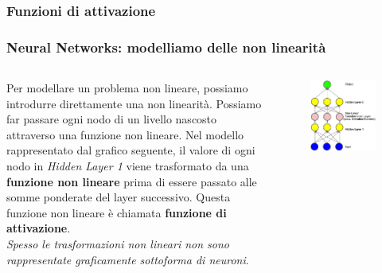 \subsubsection[Funzioni di attivazione]{Funzioni di attivazione}

\begin{frame}

	\frametitle{Neural Networks: modelliamo delle non linearità}

	\begin{columns}
		Per modellare un problema non lineare, possiamo introdurre direttamente una non linearità. Possiamo far passare ogni nodo di un livello nascosto attraverso una funzione non lineare.
		\newlinedouble
		Nel modello rappresentato dal grafico seguente, il valore di ogni nodo in \textit{Hidden Layer 1} viene trasformato da una \textbf{funzione non lineare} prima di essere passato alle somme ponderate del layer successivo. Questa funzione non lineare è chiamata \textbf{funzione di attivazione}.\\
		\textit{Spesso le trasformazioni non lineari non sono rappresentate graficamente sottoforma di neuroni}.

		\begin{figure}[!htbp]
			\centering
			\includegraphics[width=1.05\linewidth]{images/supervised/z_algorithms_neural_networks/activation.png}
		\end{figure}
	\end{columns}


\end{frame}


